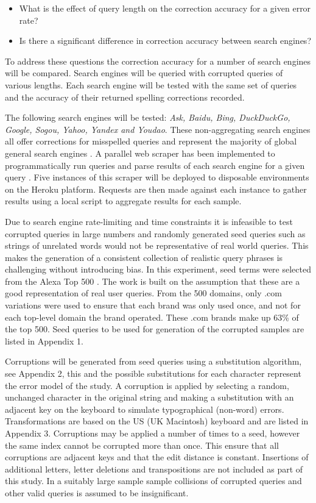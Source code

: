 \documentclass{csfourzero}
\begin{document}
\begin{itemize}
  \item{What is the effect of query length on the correction accuracy for a given error rate?}
  \item{Is there a significant difference in correction accuracy between search engines?}
\end{itemize}

To address these questions the correction accuracy for a number of search engines will be compared. Search engines will be queried with corrupted queries of various lengths. Each search engine will be tested with the same set of queries and the accuracy of their returned spelling corrections recorded.

The following search engines will be tested: \textit{Ask, Baidu, Bing, DuckDuckGo, Google, Sogou, Yahoo, Yandex and Youdao}. These non-aggregating search engines all offer corrections for misspelled queries and represent the majority of global general search engines \cite{searchenginewiki}. A parallel web scraper has been implemented to programmatically run queries and parse results of each search engine for a given query \cite{scraper}. Five instances of this scraper will be deployed to disposable environments on the Heroku platform. Requests are then made against each instance to gather results using a local script to aggregate results for each sample.

Due to search engine rate-limiting and time constraints it is infeasible to test corrupted queries in large numbers and randomly generated seed queries such as strings of unrelated words would not be representative of real world queries. This makes the generation of a consistent collection of realistic query phrases is challenging without introducing bias. In this experiment, seed terms were selected from the Alexa Top 500 \cite{alexatop500}. The work is built on the assumption that these are a good representation of real user queries. From the 500 domains, only .com variations were used to ensure that each brand was only used once, and not for each top-level domain the brand operated. These .com brands make up 63\% of the top 500. Seed queries to be used for generation of the corrupted samples are listed in Appendix 1.

Corruptions will be generated from seed queries using a substitution algorithm, see Appendix 2, this and the possible substitutions for each character represent the error model of the study. A corruption is applied by selecting a random, unchanged character in the original string and making a substitution with an adjacent key on the keyboard to simulate typographical (non-word) errors. Transformations are based on the US (UK Macintosh) keyboard and are listed in Appendix 3. Corruptions may be applied a number of times to a seed, however the same index cannot be corrupted more than once. This ensure that all corruptions are adjacent keys and that the edit distance is constant. Insertions of additional letters, letter deletions and transpositions are not included as part of this study. In a suitably large sample sample collisions of corrupted queries and other valid queries is assumed to be insignificant.
\end{document}
